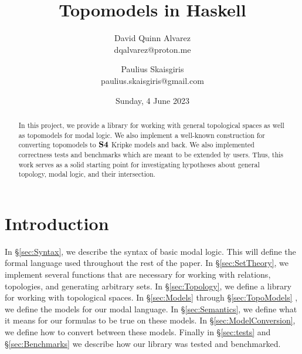 \documentclass[12pt, a4paper]{article}
\title{Topomodels in Haskell}
\author{David Quinn Alvarez \\ {\small dqalvarez@proton.me} \and Paulius Skaisgiris \\ {\small paulius.skaisgiris@gmail.com}}
\date{Sunday, 4 June 2023}
\begin{document}
\maketitle

\begin{abstract}
In this project, we provide a library for working with general topological spaces as well as topomodels for modal logic.
We also implement a well-known construction for converting topomodels to $\mathbf{S4}$ Kripke models and back. We also implemented
correctness tests and benchmarks which are meant to be extended by users. Thus, this work serves as a solid starting point for investigating
hypotheses about general topology, modal logic, and their intersection.
\end{abstract}

\tableofcontents

\clearpage

\section{Introduction}

In \S \ref{sec:Syntax}, we describe the syntax of basic modal logic.
This will define the formal language used throughout the rest of the paper.
In \S \ref{sec:SetTheory}, we implement several functions that are necessary for working with relations, topologies, and generating arbitrary sets.
In \S \ref{sec:Topology}, we define a library for working with topological spaces.
In \S \ref{sec:Models} through \S \ref{sec:TopoModels} , we define the models for our modal language.
In \S \ref{sec:Semantics}, we define what it means for our formulas to be true on these models.
In \S \ref{sec:ModelConversion}, we define how to convert between these models.
Finally in \S \ref{sec:tests} and \S \ref{sec:Benchmarks} we describe how our library was tested and benchmarked.


















\end{document}
